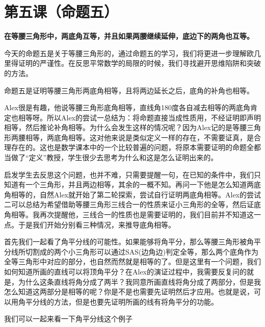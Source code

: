 \documentclass[
]{book}
\begin{document}
\hypertarget{ux7b2cux4e94ux8bfeux547dux9898ux4e94}{%
\chapter{第五课（命题五）}\label{ux7b2cux4e94ux8bfeux547dux9898ux4e94}}

\textbf{在等腰三角形中，两底角互等，并且如果两腰继续延伸，底边下的两角也互等。}

今天的命题五是关于等腰三角形的，通过命题五的学习，我们将更进一步理解欧几里得证明的严谨性。在反思平常数学的局限的时候，我们寻找避开思维陷阱和突破的方法。

命题五是证明等腰三角形两底角相等，且将两边延长之后，底角的补角也相等。

Alex很是有趣，他说等腰三角形底角相等，直线角180度各自减去相等的两底角肯定也相等呀。所以Alex的尝试一总结为：将命题直接当成性质用，不经证明即声明相等，然后推论补角相等。为什么会发生这样的情况呢？因为Alex记的是等腰三角形两腰相等，两底角相等。这对他来说是类似定义一样的存在，不需要证真，是合理存在的。这也是数学课本中的一个比较普遍的问题，将原本需要证明的命题全都当做了``定义''教授，学生很少去思考为什么和这是怎么证明出来的。

启发学生去反思这个问题，也并不难，只需要提醒一句，在已知的条件中，我们只知道有一个三角形，并且两边相等，其余的一概不知。再问一下他是怎么知道两底角相等的，自然Alex就开始了第二轮探索，尝试自行证明两底角相等。Alex的尝试二可以总结为希望借助等腰三角形三线合一的性质来证小三角形的全等，然后证底角相等。我再次提醒他，三线合一的性质也是需要证明的，我们目前并不知道这一点。于是我们开始分别看三种情况，来推导底角相等。

首先我们一起看了角平分线的可能性。如果能够将角平分，那么等腰三角形被角平分线所切割成的两个小三角形可以通过SAS(边角边)判定全等，那么两个底角作为全等三角形中对应的部分，也自然而然就是相等的了。但是这里有一个问题，我们如何知道所画的直线可以将顶角平分？在Alex的演证过程中，我需要反复问的就是，为什么这条直线将角分成了两半？我同意所画直线将角分成了两部分，但是我怎么知道这两部分是相等的呢？你是不是也需要先证明然后才应用。也就是说，可以用角平分线的方法，但是也要先证明所画的线有将角平分的功能。

我们可以一起来看一下角平分线这个例子
\end{document}

